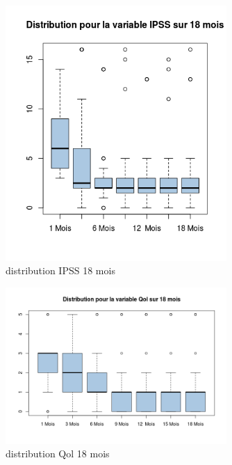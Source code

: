 \begin{figure}[!h]
\centering
\includegraphics[width=0.75\textwidth]{../Fig/VPPBS//vppbs-boxplot-post-ipss}
\caption{distribution IPSS 18 mois}
\end{figure}

\begin{figure}[!h]
\centering
\includegraphics[width=0.75\textwidth]{../Fig/VPPBS//vppbs-boxplot-post-Qol}
\caption{distribution Qol 18 mois}
\end{figure}

%
%
%
%

